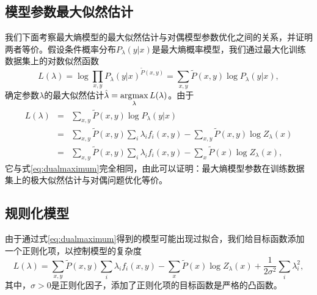 \subsection{模型参数最大似然估计}
我们下面考察最大熵模型的最大似然估计与对偶模型参数优化之间的关系，并证明两者等价。假设条件概率分布$P_\lambda(y|x)$是最大熵概率模型，我们通过最大化训练数据集上的对数似然函数
\begin{equation}
    L(\lambda) = \log \prod\limits_{x,y} P_\lambda(y|x)^{\tilde P(x,y)} = \sum\limits_{x,y} \tilde P(x,y) \log P_\lambda(y|x),
\end{equation}
确定参数$\lambda$的最大似然估计$\hat\lambda = \operatorname*{\mathrm{\arg\!\max}}\limits_\lambda L(\lambda)$。由于
\begin{equation}
    \begin{array}{lcl}
         L(\lambda) &=& \sum\limits_{x,y} \tilde P(x,y) \log P_\lambda(y|x)\\
         &=& \sum\limits_{x,y} \tilde P(x,y) \sum\limits_i \lambda_i f_i(x,y) - \sum\limits_{x,y} \tilde P(x,y) \log Z_\lambda(x)\\
         &=& \sum\limits_{x,y} \tilde P(x,y) \sum\limits_i \lambda_i f_i(x,y) - \sum\limits_{x} \tilde P(x) \log Z_\lambda(x),
    \end{array}
\end{equation}
它与式\eqref{eq:dualmaximum}完全相同，由此可以证明：最大熵模型参数在训练数据集上的极大似然估计与对偶问题优化等价。

\subsection{规则化模型}
由于通过式\eqref{eq:dualmaximum}得到的模型可能出现过拟合，我们给目标函数添加一个正则化项\cite{huang2010iterative}，以控制模型的复杂度
\begin{equation}
    L(\lambda) = \sum\limits_{x,y} \tilde P(x,y) \sum\limits_i \lambda_i f_i(x,y) - \sum\limits_{x} \tilde P(x) \log Z_\lambda(x) + \frac{1}{2\sigma^2} \sum\limits_i \lambda_i^2,
\end{equation}
其中，$\sigma>0$是正则化因子，添加了正则化项的目标函数是严格的凸函数。

